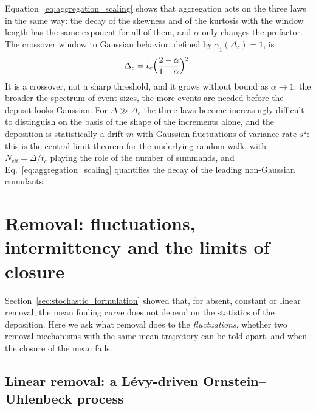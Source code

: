 \documentclass[preprint,12pt]{elsarticle}
\begin{document}
Equation~\eqref{eq:aggregation_scaling} shows that aggregation acts on the
three laws in the same way: the decay of the skewness and of the kurtosis with
the window length has the same exponent for all of them, and $\alpha$ only
changes the prefactor. The crossover window to Gaussian behavior, defined by
$\gamma_1(\Delta_c)=1$, is
\begin{equation}
  \Delta_c=t_c\Bigl(\frac{2-\alpha}{1-\alpha}\Bigr)^{2}.
  \label{eq:crossover_window}
\end{equation}
It is a crossover, not a sharp threshold, and it grows without bound
as $\alpha\to1$: the broader the spectrum of event sizes, the more events are
needed before the deposit looks Gaussian. For $\Delta\gg\Delta_c$ the three
laws become increasingly difficult to distinguish on the basis of the
shape of the increments alone, and the deposition
is statistically a drift $m$ with Gaussian fluctuations of variance rate
$s^2$: this is the central limit theorem for the underlying random walk, 
with $N_{\mathrm{eff}}=\Delta/t_c$ playing the role of
the number of summands, and Eq.~\eqref{eq:aggregation_scaling} quantifies
the decay of the leading non-Gaussian cumulants.

\section{Removal: fluctuations, intermittency and the limits of closure}
\label{sec:removal}

Section~\ref{sec:stochastic_formulation} showed that, for absent, constant
or linear removal, the mean
fouling curve does not depend on the statistics of the deposition. Here we ask
what removal does to the \emph{fluctuations}, whether two removal mechanisms
with the same mean trajectory can be told apart, and when the closure of the
mean fails.

\subsection{Linear removal: a L\'evy-driven Ornstein--Uhlenbeck process}
\label{sec:removal_linear}
\end{document}
